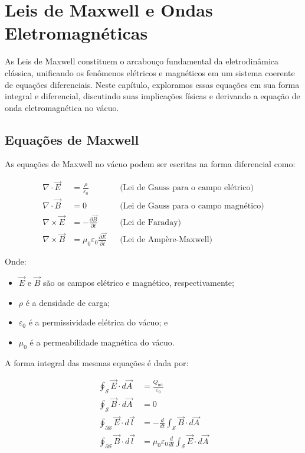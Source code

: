 \chapter{Leis de Maxwell e Ondas Eletromagnéticas} \label{chap:maxwell}


As Leis de Maxwell constituem o arcabouço fundamental da eletrodinâmica clássica, unificando os fenômenos elétricos e magnéticos em um sistema coerente de equações diferenciais. Neste capítulo, exploramos essas equações em sua forma integral e diferencial, discutindo suas implicações físicas e derivando a equação de onda eletromagnética no vácuo.

\section{Equações de Maxwell}

As equações de Maxwell no vácuo podem ser escritas na forma diferencial como:

\begin{align}
  \nabla \cdot \vec{E} &= \frac{\rho}{\varepsilon_0} && \text{(Lei de Gauss para o campo elétrico)} \label{eq:maxwell1} \\
  \nabla \cdot \vec{B} &= 0 && \text{(Lei de Gauss para o campo magnético)} \label{eq:maxwell2} \\
  \nabla \times \vec{E} &= -\frac{\partial \vec{B}}{\partial t} && \text{(Lei de Faraday)} \label{eq:maxwell3} \\
  \nabla \times \vec{B} &= \mu_0 \varepsilon_0 \frac{\partial \vec{E}}{\partial t} && \text{(Lei de Ampère-Maxwell)} \label{eq:maxwell4}
\end{align}

Onde:
\begin{itemize}
    \item $\vec{E}$ e $\vec{B}$ são os campos elétrico e magnético, respectivamente;
    \item $\rho$ é a densidade de carga;
    \item $\varepsilon_0$ é a permissividade elétrica do vácuo; e
    \item $\mu_0$ é a permeabilidade magnética do vácuo.
\end{itemize}

A forma integral das mesmas equações é dada por:

\begin{align}
  \oint_{\mathcal{S}} \vec{E} \cdot d\vec{A} &= \frac{Q_{\text{int}}}{\varepsilon_0} \label{eq:maxwell-int1} \\
  \oint_{\mathcal{S}} \vec{B} \cdot d\vec{A} &= 0 \label{eq:maxwell-int2} \\
  \oint_{\partial \mathcal{S}} \vec{E} \cdot d\vec{l} &= -\frac{d}{dt} \int_{\mathcal{S}} \vec{B} \cdot d\vec{A} \label{eq:maxwell-int3} \\
  \oint_{\partial \mathcal{S}} \vec{B} \cdot d\vec{l} &= \mu_0 \varepsilon_0 \frac{d}{dt} \int_{\mathcal{S}} \vec{E} \cdot d\vec{A} \label{eq:maxwell-int4}
\end{align}

